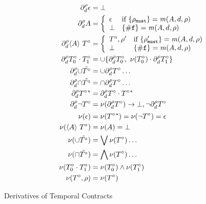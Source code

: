   {\begin{align*}
      \partial_{d}^{\rho}{\epsilon} &= \bot
      \\
      \partial_{d}^{\rho}{A} &= \left\{
        \begin{array}{ll}
          \epsilon & \text{if } \{\rho_{\tt must}\} = \mathit{m}(A, d, \rho) \\
          \bot & \{{\tt \#f}\} = \mathit{m}(A, d, \rho)
        \end{array}\right.
      \\
      \partial_{d}^{\rho}{\langle A\rangle\ T^\circ} &=
      \left\{\begin{array}{ll}
          T^\circ,\rho' & \text{if } \{\rho'_{\tt must}\} = \mathit{m}(A, d, \rho) \\
          \bot & \{{\tt \#f}\} = \mathit{m}(A, d, \rho)
        \end{array}\right.
      \\
      \partial_{d}^{\rho}{T^\circ_0 \cdot T^\circ_1} &=
      \cup \{\partial_{d}^{\rho}{T^\circ_0},\
          \nu(T^\circ_0) \cdot \partial_{d}^{\rho}{T^\circ_1}\}
      \\
      \partial_{d}^{\rho}{\cup \tilde{T^\circ}} &=
      \cup \partial_{d}^{\rho}{T^\circ}\ldots
      \\
      \partial_{d}^{\rho}{\cap \tilde{T^\circ}} &=
      \cap \partial_{d}^{\rho}{T^\circ}\ldots
      \\
      \partial_{d}^{\rho}{T^\circ{}^*} &=
      \partial_{d}^{\rho}{T^\circ} \cdot T^\circ{}^*
      \\
      \partial_{d}^{\rho}{\neg T^\circ} &=
      \nu(\partial_{d}^{\rho}{T^\circ}) \to \bot,
      \neg \partial_{d}^{\rho}{T^\circ}
      \\[2pt]
      \nu(\epsilon) &= \nu(T^\circ{}^*) =
      \nu(\neg T^\circ) = \epsilon
      \\
      \nu(\langle A\rangle\ T^\circ) &= \nu(A) = \bot
      \\
      \nu(\cup \tilde{T^\circ}) &=
      \bigvee{\nu(T^\circ)\ldots}
      \\
      \nu(\cap \tilde{T^\circ}) &=
      \bigwedge{\nu(T^\circ)\ldots}
      \\
      \nu(T^\circ_0 \cdot T^\circ_1) &=
      \nu(T^\circ_0)\wedge \nu(T^\circ_1)
      \\
      \nu(T^\circ,\rho) &= \nu(T^\circ)
    \end{align*}}{\caption{Derivatives of Temporal Contracts}\label{fig:tcon-deriv}}

